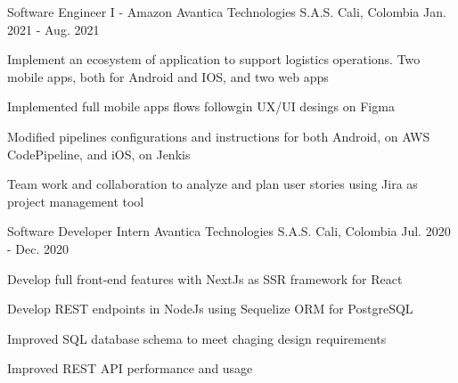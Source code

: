\begin{cventries}
  \cventry
  {Software Engineer I - Amazon} %
  {Avantica Technologies S.A.S.} %
  {Cali, Colombia} %
  {Jan. 2021 - Aug. 2021} %
  {
    \begin{cvitems} %
      \item {Implement an ecosystem of application to support logistics operations. Two mobile apps, both for Android and IOS, and two web apps}
      \item {Implemented full mobile apps flows followgin UX/UI desings on Figma}
      \item {Modified pipelines configurations and instructions for both Android, on AWS CodePipeline, and iOS, on Jenkis}
      \item {Team work and collaboration to analyze and plan user stories using Jira as project management tool}
    \end{cvitems}
  }

  \cventry
    {Software Developer Intern} %
    {Avantica Technologies S.A.S.} %
    {Cali, Colombia} %
    {Jul. 2020 - Dec. 2020} %
    {
      \begin{cvitems} %
        \item {Develop full front‐end features with NextJs as SSR framework for React}
        \item {Develop REST endpoints in NodeJs using Sequelize ORM for PostgreSQL}
        \item {Improved SQL database schema to meet chaging design requirements}
        \item {Improved REST API performance and usage}
      \end{cvitems}
    }

\end{cventries}
